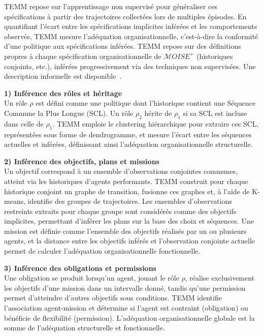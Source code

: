 \documentclass[final]{jfsma}
\begin{document}
TEMM repose sur l'apprentissage non supervisé pour généraliser ces spécifications à partir des trajectoires collectées lors de multiples épisodes. En quantifiant l'écart entre les spécifications implicites inférées et les comportements observés, TEMM mesure l'adéquation organisationnelle, c'est-à-dire la conformité d'une politique aux spécifications inférées. TEMM repose sur des définitions propres à chaque spécification organisationnelle de \(\mathcal{M}OISE^+\) (historiques conjoints, etc.), inférées progressivement via des techniques non supervisées. Une description informelle est disponible~\hyperref[fn:github]{\footnotemark[2]}.


\noindent\textbf{1) Inférence des rôles et héritage} \\
Un rôle \(\rho\) est défini comme une politique dont l'historique contient une Séquence Commune la Plus Longue (SCL). Un rôle \(\rho_2\) hérite de \(\rho_1\) si sa SCL est incluse dans celle de \(\rho_1\). TEMM emploie le clustering hiérarchique pour extraire ces SCL, représentées sous forme de dendrogramme, et mesure l'écart entre les séquences actuelles et inférées, définissant ainsi l'adéquation organisationnelle structurelle.

\noindent\textbf{2) Inférence des objectifs, plans et missions} \\
Un objectif correspond à un ensemble d'observations conjointes communes, atteint via les historiques d'agents performants. TEMM construit pour chaque historique conjoint un graphe de transition, fusionne ces graphes et, à l'aide de K-means, identifie des groupes de trajectoires. Les ensembles d'observations restreints extraits pour chaque groupe sont considérés comme des objectifs implicites, permettant d'inférer les plans sur la base des choix et séquences. Une mission est définie comme l'ensemble des objectifs réalisés par un ou plusieurs agents, et la distance entre les objectifs inférés et l'observation conjointe actuelle permet de calculer l'adéquation organisationnelle fonctionnelle.

\noindent\textbf{3) Inférence des obligations et permissions} \\
Une obligation se produit lorsqu'un agent, jouant le rôle \(\rho\), réalise exclusivement les objectifs d'une mission dans un intervalle donné, tandis qu'une permission permet d'atteindre d'autres objectifs sous conditions. TEMM identifie l'association agent-mission et détermine si l'agent est contraint (obligation) ou bénéficie de flexibilité (permission). L'adéquation organisationnelle globale est la somme de l'adéquation structurelle et fonctionnelle.
\end{document}
